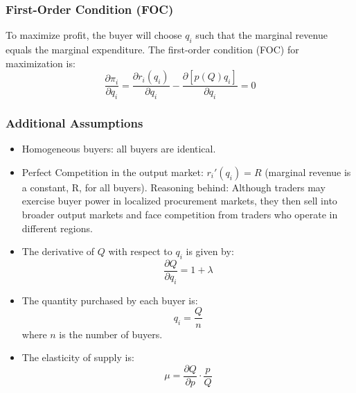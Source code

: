 \documentclass[12pt]{article}
\begin{document}
\subsubsection{First-Order Condition (FOC)}
To maximize profit, the buyer will choose \( q_i \) such that the marginal revenue equals the marginal expenditure. The first-order condition (FOC) for maximization is:
\begin{equation}
\frac{\partial \pi_i}{\partial q_i} = \frac{\partial r_i(q_i)}{\partial q_i} - \frac{\partial [p(Q) q_i]}{\partial q_i} = 0
\end{equation}

\subsubsection{Additional Assumptions}
\begin{itemize}
  \item Homogeneous buyers: all buyers are identical.
  \item Perfect Competition in the output market: \( r_i'(q_i) = R \) (marginal revenue is a constant, R, for all buyers). Reasoning behind: Although traders may exercise buyer power in localized procurement markets, they then sell into broader output markets and face competition from traders who operate in different regions.
  \item The derivative of \( Q \) with respect to \( q_i \) is given by:
    \begin{equation}
    \frac{\partial Q}{\partial q_i} = 1 + \lambda
    \end{equation}
  \item The quantity purchased by each buyer is:
    \begin{equation}
    q_i = \frac{Q}{n}
    \end{equation}
    where \( n \) is the number of buyers.
  \item The elasticity of supply is:
    \begin{equation}
    \mu = \frac{\partial Q}{\partial p} \cdot \frac{p}{Q}
    \end{equation}
\end{itemize}
\end{document}

